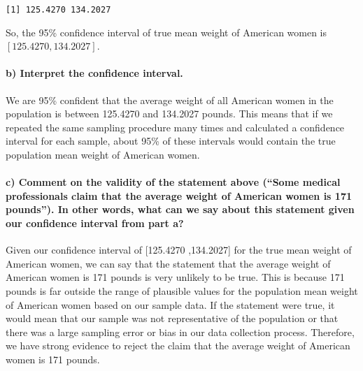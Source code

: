 \documentclass[
]{article}
\begin{document}
\begin{verbatim}
[1] 125.4270 134.2027
\end{verbatim}

So, the 95\% confidence interval of true mean weight of American women
is \([125.4270 ,134.2027]\).

\hypertarget{b-interpret-the-confidence-interval.}{%
\paragraph{b) Interpret the confidence
interval.}\label{b-interpret-the-confidence-interval.}}

We are 95\% confident that the average weight of all American women in
the population is between 125.4270 and 134.2027 pounds. This means that
if we repeated the same sampling procedure many times and calculated a
confidence interval for each sample, about 95\% of these intervals would
contain the true population mean weight of American women.

\hypertarget{c-comment-on-the-validity-of-the-statement-above-some-medical-professionals-claim-that-the-average-weight-of-american-women-is-171-pounds.-in-other-words-what-can-we-say-about-this-statement-given-our-confidence-interval-from-part-a}{%
\paragraph{c) Comment on the validity of the statement above (``Some
medical professionals claim that the average weight of American women is
171 pounds''). In other words, what can we say about this statement
given our confidence interval from part
a?}\label{c-comment-on-the-validity-of-the-statement-above-some-medical-professionals-claim-that-the-average-weight-of-american-women-is-171-pounds.-in-other-words-what-can-we-say-about-this-statement-given-our-confidence-interval-from-part-a}}

Given our confidence interval of {[}125.4270 ,134.2027{]} for the true
mean weight of American women, we can say that the statement that the
average weight of American women is 171 pounds is very unlikely to be
true. This is because 171 pounds is far outside the range of plausible
values for the population mean weight of American women based on our
sample data. If the statement were true, it would mean that our sample
was not representative of the population or that there was a large
sampling error or bias in our data collection process. Therefore, we
have strong evidence to reject the claim that the average weight of
American women is 171 pounds.
\end{document}
